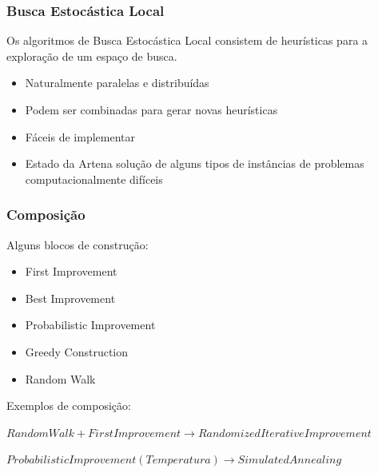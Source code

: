 \documentclass[10pt, compress]{beamer}
\begin{document}
\begin{frame}[fragile]
\begin{columns}
\begin{figure}[h]
        \end{figure}
    \end{columns}
    \let\thefootnote\relax{}
\end{frame}

\begin{frame}[fragile]
    \frametitle{Busca Estocástica Local}
    Os algoritmos de Busca Estocástica Local consistem de
    \alert{heurísticas} para a exploração de um espaço de busca.
    \pause
    \begin{itemize}
        \item Naturalmente \alert{paralelas} e \alert{distribuídas}
        \item Podem ser \alert{combinadas} para gerar novas heurísticas
            \pause
        \item \alert{Fáceis} de implementar
            \pause
        \item \alert{Estado da Arte}\footnotemark[1]\footnotemark[2] na solução
            de \alert{alguns tipos} de instâncias de problemas computacionalmente
            difíceis
    \end{itemize}
\end{frame}

\begin{frame}[fragile]
    \frametitle{Composição}
    Alguns \alert{blocos de construção}:
    \begin{itemize}
        \item First Improvement
        \item Best Improvement
        \item Probabilistic Improvement
        \item Greedy Construction
        \item Random Walk
    \end{itemize}
            \pause
    Exemplos de \alert{composição}:

    \small{$RandomWalk + FirstImprovement \rightarrow RandomizedIterativeImprovement$}
    \pause

    \small{$ProbabilisticImprovement(Temperatura) \rightarrow SimulatedAnnealing$}
\end{frame}
\end{document}
